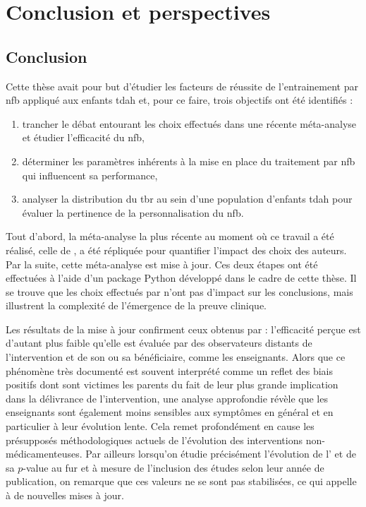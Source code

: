 \chapter{Conclusion et perspectives} \label{chapitre-5}

\section{Conclusion}

Cette thèse avait pour but d'étudier les facteurs de réussite de l'entrainement par \gls{nfb} appliqué aux enfants \gls{tdah} et, pour ce faire, trois objectifs ont été identifiés :
\begin{enumerate}
\item trancher le débat entourant les choix effectués dans une récente méta-analyse et étudier l'efficacité du \gls{nfb},
\item déterminer les paramètres inhérents à la mise en place du traitement par \gls{nfb} qui influencent sa performance,
\item analyser la distribution du \gls{tbr} au sein d'une population d'enfants \gls{tdah} pour évaluer la pertinence de la personnalisation du \gls{nfb}.
\end{enumerate}

Tout d'abord, la méta-analyse la plus récente au moment où ce travail a été réalisé, celle de \citet{Cortese2016}, a été répliquée 
pour quantifier l'impact des choix des auteurs. Par la suite, cette méta-analyse est mise à jour. Ces deux étapes ont été effectuées à l'aide d'un package Python développé 
dans le cadre de cette thèse. Il se trouve que les choix effectués par \citet{Cortese2016} n'ont pas d'impact sur les conclusions, mais illustrent la complexité de l'émergence de la preuve
clinique.


Les résultats de la mise à jour confirment ceux obtenus par \citet{Cortese2016} : 
l'efficacité perçue est d'autant plus faible qu'elle est évaluée par 
des observateurs distants de l'intervention et de son ou sa bénéficiaire, comme les enseignants. Alors que ce phénomène très documenté est souvent 
interprété comme un reflet des biais positifs dont sont victimes les parents du fait de leur plus grande implication dans la délivrance de 
l'intervention, une analyse approfondie révèle que les enseignants sont également moins sensibles aux symptômes en général et en particulier à leur évolution lente. 
Cela remet profondément en cause les présupposés méthodologiques actuels de l'évolution des interventions non-médicamenteuses. Par ailleurs
lorsqu'on étudie précisément l'évolution de l' et de sa $p$-value au fur et à mesure de l'inclusion des études selon leur année de publication, on remarque que ces valeurs ne se sont pas 
stabilisées, ce qui appelle à de nouvelles mises à jour.


